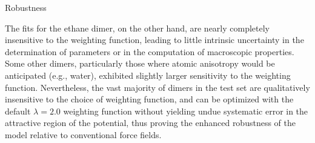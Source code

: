 \begin{subsection}{Robustness}
\begin{figure}
    \end{figure}

The \isaffold fits for the ethane dimer, on the other hand, are nearly completely
insensitive to the weighting function, leading to little intrinsic uncertainty
in the determination of parameters or in the computation of macroscopic
properties. Some other dimers, particularly those where
atomic anisotropy would be anticipated (e.g., water), exhibited slightly larger
sensitivity to the weighting function. Nevertheless, the
vast majority of dimers in the test set are qualitatively insensitive to the choice of
weighting function, and can be optimized with the default $\lambda = 2.0$
weighting function without yielding undue systematic error in the attractive
region of the potential, thus proving the enhanced robustness of the \isaffold
model relative to conventional force fields.

\end{subsection}
